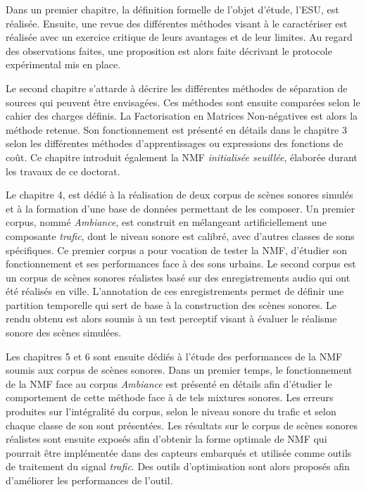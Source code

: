 Dans un premier chapitre, la définition formelle de l'objet d'étude, l'ESU, est réalisée. Ensuite, une revue des différentes méthodes visant à le caractériser est réalisée avec un exercice critique de leurs avantages et de leur limites. Au regard des observations faites, une proposition est alors faite décrivant le protocole expérimental mis en place.

Le second chapitre s'attarde à décrire les différentes méthodes de séparation de sources qui peuvent être envisagées. Ces méthodes sont ensuite comparées selon le cahier des charges définis. La Factorisation en Matrices Non-négatives est alors la méthode retenue. 
Son fonctionnement est présenté en détails dans le chapitre 3 selon les différentes méthodes d'apprentissages ou expressions des fonctions de coût. Ce chapitre introduit également la NMF \textit{initialisée seuillée}, élaborée durant les travaux de ce doctorat. 

Le chapitre 4, est dédié à la réalisation de deux corpus de scènes sonores simulés et à la formation d'une base de données permettant de les composer. 
Un premier corpus, nommé \textit{Ambiance}, est construit en mélangeant artificiellement une composante \textit{trafic}, dont le niveau sonore est calibré, avec d'autres classes de sons spécifiques. Ce premier corpus a pour vocation de tester la NMF, d'étudier son fonctionnement et ses performances face à des sons urbains. 
Le second corpus est un corpus de scènes sonores réalistes basé sur des enregistrements audio qui ont été réalisés en ville.
L'annotation de ces enregistrements permet de définir une partition temporelle qui sert de base à la construction des scènes sonores. Le rendu obtenu est alors soumis à un test perceptif visant à évaluer le réalisme sonore des scènes simulées. 

Les chapitres 5 et 6 sont ensuite dédiés à l'étude des performances de la NMF soumis aux corpus de scènes sonores. Dans un premier temps, le fonctionnement de la NMF face au corpus \textit{Ambiance} est présenté en détails afin d'étudier le comportement de cette méthode face à de tels mixtures sonores. Les erreurs produites sur l'intégralité du corpus, selon le niveau sonore du trafic et selon chaque classe de son sont présentées. 
Les résultats sur le corpus de scènes sonores réalistes sont ensuite exposés afin d'obtenir la forme optimale de NMF qui pourrait être implémentée dans des capteurs embarqués et utilisée comme outils de traitement du signal \textit{trafic}. Des outils d'optimisation sont alors proposés afin d'améliorer les performances de l'outil.